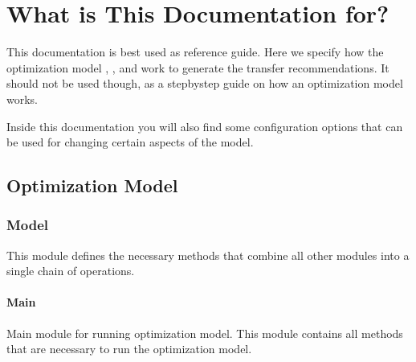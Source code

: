 \documentclass[letterpaper,10pt,english]{sphinxmanual}
\begin{document}
\chapter{What is This Documentation for?}
\label{\detokenize{index:what-is-this-documentation-for}}
This documentation is best used as reference guide. Here we specify how the optimization model , , and  work to generate the
transfer recommendations. It should not be used though, as a step\sphinxhyphen{}by\sphinxhyphen{}step guide on how an optimization model works.

Inside this documentation you will also find some configuration options that can be used for changing certain aspects of the model.


\section{Optimization Model}
\label{\detokenize{source/optimization:optimization-model}}\label{\detokenize{source/optimization::doc}}

\subsection{Model}
\label{\detokenize{source/optimization.model:model}}\label{\detokenize{source/optimization.model::doc}}
This module defines the necessary methods that combine all other modules into a single chain of operations.


\subsubsection{Main}
\label{\detokenize{source/optimization.model:module-optimization.model.main}}\label{\detokenize{source/optimization.model:main}}
Main  module for running optimization model. This module contains all methods that are necessary to run the optimization model.
\end{document}
